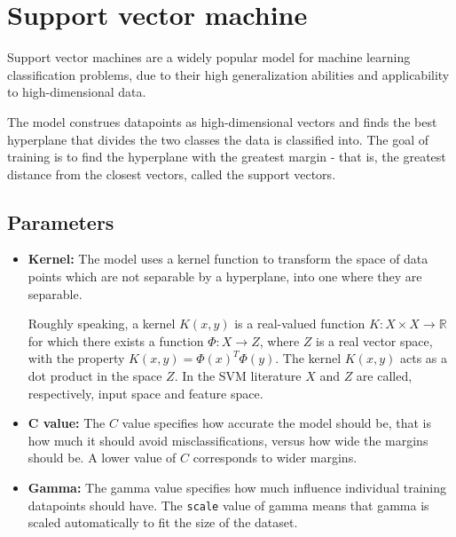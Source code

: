 \section{Support vector machine}


Support vector machines \cite{support_vector_machine} are a widely popular model for machine learning classification problems, due to their high generalization abilities and applicability to high-dimensional data.

The model construes datapoints as high-dimensional vectors and finds the best hyperplane that divides the two classes the data is classified into. The goal of training is to find the hyperplane with the greatest margin - that is, the greatest distance from the closest vectors, called the support vectors.

\subsection{Parameters}
\begin{itemize}
	\item \textbf{Kernel:} The model uses a kernel function to transform the space of data points which are not separable by a hyperplane, into one where they are separable.

	      Roughly speaking, a kernel \( K(x, y) \) is a real-valued
	      function \( K : X \times X \rightarrow \mathbb{R} \) for which there exists a
	      function \( \Phi : X \rightarrow Z \), where \( Z \) is a real vector space,
	      with the property \( K(x, y) = \Phi(x)^T \Phi(y) \). The
	      kernel \( K(x, y) \) acts as a dot product in the space \( Z \).
	      In the SVM literature \( X \) and \( Z \) are called, respectively, input space and feature space. \cite{support_vector_machine} %

	\item \textbf{C value:} The \(C\) value specifies how accurate the model should be, that is how much it should avoid misclassifications, versus how wide the margins should be. A lower value of \(C\) corresponds to wider margins. %

	\item \textbf{Gamma:} The gamma value specifies how much influence individual training datapoints should have. The \verb|scale| value of gamma means that gamma is scaled automatically to fit the size of the dataset.
\end{itemize}

